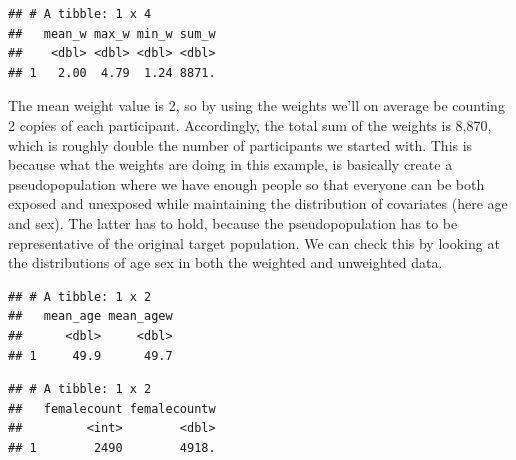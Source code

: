\documentclass[
]{book}
\newenvironment{Shaded}{\begin{snugshade}}{\end{snugshade}}
\newcommand{\DataTypeTok}[1]{\textcolor[rgb]{0.13,0.29,0.53}{#1}}
\newcommand{\DecValTok}[1]{\textcolor[rgb]{0.00,0.00,0.81}{#1}}
\newcommand{\KeywordTok}[1]{\textcolor[rgb]{0.13,0.29,0.53}{\textbf{#1}}}
\newcommand{\NormalTok}[1]{#1}
\newcommand{\OperatorTok}[1]{\textcolor[rgb]{0.81,0.36,0.00}{\textbf{#1}}}
\newcommand{\StringTok}[1]{\textcolor[rgb]{0.31,0.60,0.02}{#1}}
\begin{document}
\begin{verbatim}
## # A tibble: 1 x 4
##   mean_w max_w min_w sum_w
##    <dbl> <dbl> <dbl> <dbl>
## 1   2.00  4.79  1.24 8871.
\end{verbatim}

The mean weight value is 2, so by using the weights we'll on average be counting 2 copies of each participant. Accordingly, the total sum of the weights is 8,870, which is roughly double the number of participants we started with. This is because what the weights are doing in this example, is basically create a pseudopopulation where we have enough people so that everyone can be both exposed and unexposed while maintaining the distribution of covariates (here age and sex). The latter has to hold, because the pseudopopulation has to be representative of the original target population. We can check this by looking at the distributions of age sex in both the weighted and unweighted data.

\begin{Shaded}
\end{Shaded}

\begin{verbatim}
## # A tibble: 1 x 2
##   mean_age mean_agew
##      <dbl>     <dbl>
## 1     49.9      49.7
\end{verbatim}

\begin{Shaded}
\end{Shaded}

\begin{verbatim}
## # A tibble: 1 x 2
##   femalecount femalecountw
##         <int>        <dbl>
## 1        2490        4918.
\end{verbatim}
\end{document}
